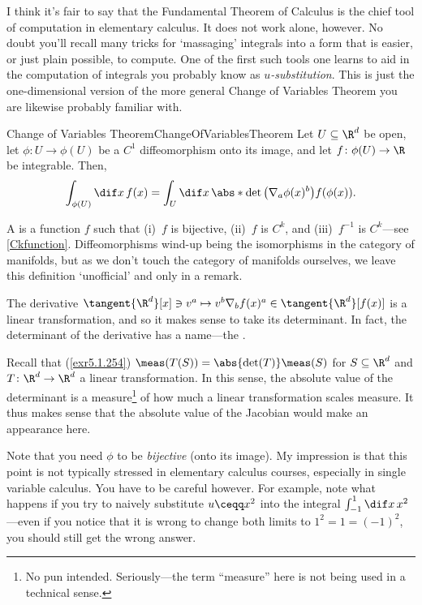 I think it's fair to say that the Fundamental Theorem of Calculus is the chief tool of computation in elementary calculus.  It does not work alone, however.  No doubt you'll recall many tricks for `massaging' integrals into a form that is easier, or just plain possible, to compute.  One of the first such tools one learns to aid in the computation of integrals you probably know as \emph{$u$-substitution}.  This is just the one-dimensional version of the more general Change of Variables Theorem you are likewise probably familiar with.
\begin{thm}{Change of Variables Theorem}{ChangeOfVariablesTheorem}
Let $U\subseteq \R ^d$ be open, let $\phi \colon U\rightarrow \phi (U)$ be a $C^1$ diffeomorphism onto its image, and let $f\colon \phi (U)\rightarrow \R$ be integrable.  Then,
\begin{equation}
\int _{\phi (U)}\dif x\, f(x)=\int _U\dif x\, \abs*{\det \left( \nabla _a\phi (x)^b\right) }f(\phi (x)).
\end{equation}
\begin{rmk}
A  is a function $f$ such that (i)~$f$ is bijective, (ii)~$f$ is $C^k$, and (iii)~$f^{-1}$ is $C^k$---see \cref{Ckfunction}.  Diffeomorphisms wind-up being the isomorphisms in the category of manifolds, but as we don't touch the category of manifolds ourselves, we leave this definition `unofficial' and only in a remark.
\end{rmk}
\begin{rmk}
The derivative $\tangent{\R ^d}[x]\ni v^a\mapsto v^b\nabla _bf(x)^a\in \tangent{\R ^d}[f(x)]$ is a linear transformation, and so it makes sense to take its determinant.  In fact, the determinant of the derivative has a name---the .
\end{rmk}
\begin{rmk}
Recall that (\cref{exr5.1.254}) $\meas (T(S))=\abs{\det (T)}\meas (S)$ for $S\subseteq \R ^d$ and $T\colon \R ^d\rightarrow \R ^d$ a linear transformation.  In this sense, the absolute value of the determinant is a measure\footnote{No pun intended.  Seriously---the term ``measure'' here is not being used in a technical sense.} of how much a linear transformation scales measure.  It thus makes sense that the absolute value of the Jacobian would make an appearance here.
\end{rmk}
\begin{rmk}
Note that you need $\phi$ to be \emph{bijective} (onto its image).  My impression is that this point is not typically stressed in elementary calculus courses, especially in single variable calculus.  You have to be careful however.  For example, note what happens if you try to naively substitute $u\ceqq x^2$ into the integral $\int _{-1}^1\dif x\, x^2$---even if you notice that it is wrong to change both limits to $1^2=1=(-1)^2$, you should still get the wrong answer.

\end{rmk}
\end{thm}
